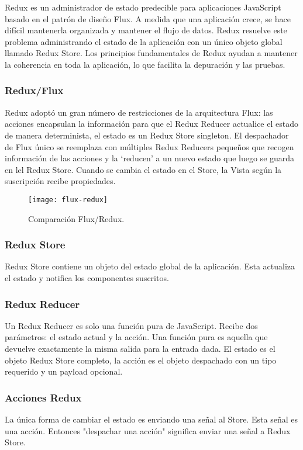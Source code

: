 Redux es un administrador de estado predecible para aplicaciones JavaScript basado en el patrón de diseño Flux. A medida que una aplicación crece, se hace difícil mantenerla organizada y mantener el flujo de datos. Redux resuelve este problema administrando el estado de la aplicación con un único objeto global llamado Redux Store. Los principios fundamentales de Redux ayudan a mantener la coherencia en toda la aplicación, lo que facilita la depuración y las pruebas.

\subsubsection{Redux/Flux}
Redux adoptó un gran número de restricciones de la arquitectura Flux: las acciones encapsulan la información para que el Redux Reducer actualice el estado de manera determinista, el estado es un Redux Store singleton. El despachador de Flux único se reemplaza con múltiples Redux Reducers pequeños que recogen información de las acciones y la `reducen' a un nuevo estado que luego se guarda en lel Redux Store. Cuando se cambia el estado en el Store, la Vista según la suscripción recibe propiedades.

\begin{figure}[H]
  \centering
  \texttt{[image: flux-redux]}
  \caption{Comparación Flux/Redux.}
\end{figure}

\subsubsection{Redux Store}
Redux Store contiene un objeto del estado global de la aplicación. Esta actualiza el estado y notifica los componentes suscritos.
\vspace{0.8cm}



\subsubsection{Redux Reducer}
Un Redux Reducer es solo una función pura de JavaScript. Recibe dos parámetros: el estado actual y la acción. Una función pura es aquella que devuelve exactamente la misma salida para la entrada dada. El estado es el objeto Redux Store completo, la acción es el objeto despachado con un tipo requerido y un payload opcional.
\vspace{0.8cm}



\subsubsection{Acciones Redux}
La única forma de cambiar el estado es enviando una señal al Store. Esta señal es una acción. Entonces "despachar una acción" significa enviar una señal a Redux Store.
\vspace{0.8cm}


